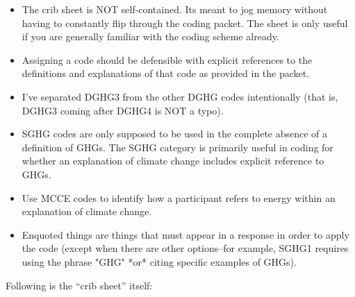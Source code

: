\begin{itemize}
\item The crib sheet is NOT self-contained. Its meant to jog memory
without having to constantly flip through the coding packet. The sheet
is only useful if you are generally familiar with the coding scheme
already.

\item Assigning a code should be defensible with explicit references to
the definitions and explanations of that code as provided in the
packet.

\item I've separated DGHG3 from the other DGHG codes intentionally (that
is, DGHG3 coming after DGHG4 is NOT a typo).

\item SGHG codes are only supposed to be used in the complete absence of a
definition of GHGs. The SGHG category is primarily useful in coding
for whether an explanation of climate change includes explicit
reference to GHGs.

\item Use MCCE codes to identify how a participant refers to energy within
an explanation of climate change.

\item Enquoted things are things that must appear in a response in order
to apply the code (except when there are other options--for example,
SGHG1 requires using the phrase "GHG" *or* citing specific examples of
GHGs).
\end{itemize}
Following is the “crib sheet” itself:


